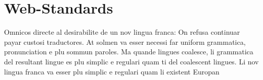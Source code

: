 \documentclass[paper=a4,fontsize=12pt,ngerman]{scrartcl}
\begin{document}
\section{Web-Standards}
Omnicos directe al desirabilite de un nov lingua franca: On refusa continuar 
payar custosi traductores. At solmen va esser necessi far uniform grammatica, 
pronunciation e plu sommun paroles. Ma quande lingues coalesce, li grammatica 
del resultant lingue es plu simplic e regulari quam ti del coalescent 
lingues. Li nov lingua franca va esser plu simplic e regulari quam li 
existent Europan
\end{document}
